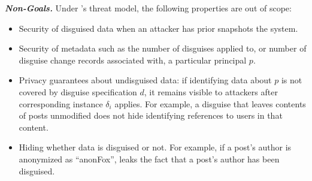 \vspace{6pt}\noindent\textbf{\emph{Non-Goals.}}
%
Under \sys's threat model, the following properties are out of scope:
%
\begin{itemize}
    \item Security of disguised data when an attacker has prior snapshots the system.
    \item Security of metadata such as the number of disguises applied to, or number of
	disguise change records associated with, a particular principal $p$.
    \item Privacy guarantees about undisguised data: if identifying data about $p$ is not covered by
        disguise specification $d$, it remains visible to attackers after corresponding instance $\delta_i$ applies.
        For example, a disguise that leaves contents of posts unmodified does not hide identifying references
	to users in that content.
    \item Hiding whether data is disguised or not. For example, if a post's author is anonymized as ``anonFox'',
        \sys leaks the fact that a post's author has been disguised.
\end{itemize}


